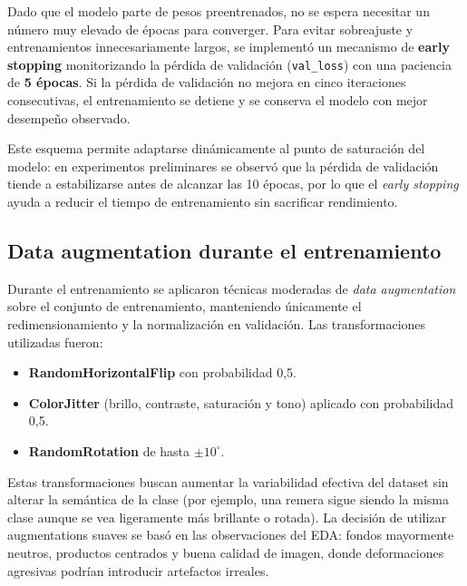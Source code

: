 Dado que el modelo parte de pesos preentrenados, no se espera necesitar un número muy elevado de épocas para converger. Para evitar sobreajuste y entrenamientos innecesariamente largos, se implementó un mecanismo de \textbf{early stopping} monitorizando la pérdida de validación (\texttt{val\_loss}) con una paciencia de \textbf{5 épocas}. Si la pérdida de validación no mejora en cinco iteraciones consecutivas, el entrenamiento se detiene y se conserva el modelo con mejor desempeño observado.

Este esquema permite adaptarse dinámicamente al punto de saturación del modelo: en experimentos preliminares se observó que la pérdida de validación tiende a estabilizarse antes de alcanzar las 10 épocas, por lo que el \textit{early stopping} ayuda a reducir el tiempo de entrenamiento sin sacrificar rendimiento.

\subsection{Data augmentation durante el entrenamiento}

Durante el entrenamiento se aplicaron técnicas moderadas de \textit{data augmentation} sobre el conjunto de entrenamiento, manteniendo únicamente el redimensionamiento y la normalización en validación. Las transformaciones utilizadas fueron:

\begin{itemize}
    \item \textbf{RandomHorizontalFlip} con probabilidad 0{,}5.
    \item \textbf{ColorJitter} (brillo, contraste, saturación y tono) aplicado con probabilidad 0{,}5.
    \item \textbf{RandomRotation} de hasta $\pm 10^\circ$.
\end{itemize}

Estas transformaciones buscan aumentar la variabilidad efectiva del dataset sin alterar la semántica de la clase (por ejemplo, una remera sigue siendo la misma clase aunque se vea ligeramente más brillante o rotada). La decisión de utilizar augmentations suaves se basó en las observaciones del EDA: fondos mayormente neutros, productos centrados y buena calidad de imagen, donde deformaciones agresivas podrían introducir artefactos irreales.
